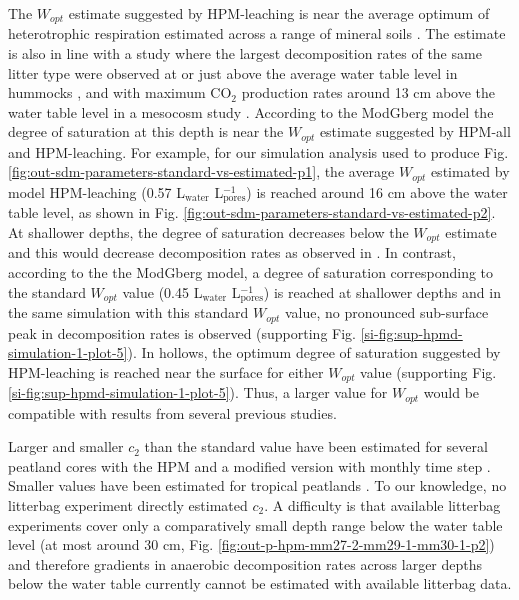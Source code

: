 \documentclass[esd, manuscript]{copernicus}
\begin{document}
The \(W_{opt}\) estimate suggested by HPM-leaching is near the average optimum of heterotrophic respiration estimated across a range of mineral soils \citep{Moyano.2013}. The estimate is also in line with a study where the largest decomposition rates of the same litter type were observed at or just above the average water table level in hummocks \citep{Belyea.1996}, and with maximum CO\(_2\) production rates around 13 cm above the water table level in a mesocosm study \citep{Blodau.2004}. According to the ModGberg model the degree of saturation at this depth is near the \(W_{opt}\) estimate suggested by HPM-all and HPM-leaching. For example, for our simulation analysis used to produce Fig. \ref{fig:out-sdm-parameters-standard-vs-estimated-p1}, the average \(W_{opt}\) estimated by model HPM-leaching (0.57 L\(_\text{water}\) L\(_\text{pores}^{-1}\)) is reached around 16 cm above the water table level, as shown in Fig. \ref{fig:out-sdm-parameters-standard-vs-estimated-p2}. At shallower depths, the degree of saturation decreases below the \(W_{opt}\) estimate and this would decrease decomposition rates as observed in \citet{Belyea.1996}. In contrast, according to the the ModGberg model, a degree of saturation corresponding to the standard \(W_{opt}\) value (0.45 L\(_\text{water}\) L\(_\text{pores}^{-1}\)) is reached at shallower depths and in the same simulation with this standard \(W_{opt}\) value, no pronounced sub-surface peak in decomposition rates is observed (supporting Fig. \ref{si-fig:sup-hpmd-simulation-1-plot-5}). In hollows, the optimum degree of saturation suggested by HPM-leaching is reached near the surface for either \(W_{opt}\) value (supporting Fig. \ref{si-fig:sup-hpmd-simulation-1-plot-5}). Thus, a larger value for \(W_{opt}\) would be compatible with results from several previous studies.

Larger and smaller \(c_2\) than the standard value have been estimated for several peatland cores with the HPM and a modified version with monthly time step \citep{Quillet.2015, Treat.2021, Treat.2022}. Smaller values have been estimated for tropical peatlands \citep{Kurnianto.2015}. To our knowledge, no litterbag experiment directly estimated \(c_2\). A difficulty is that available litterbag experiments cover only a comparatively small depth range below the water table level (at most around 30 cm, Fig. \ref{fig:out-p-hpm-mm27-2-mm29-1-mm30-1-p2}) and therefore gradients in anaerobic decomposition rates across larger depths below the water table currently cannot be estimated with available litterbag data.
\end{document}
